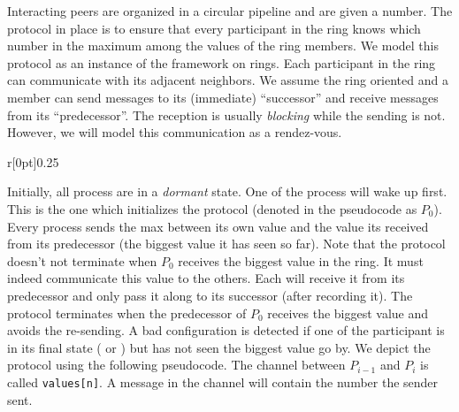 %
Interacting peers are organized in a circular pipeline and are given a
number. The protocol in place is to ensure that every participant in
the ring knows which number in the maximum among the values of the
ring members. We model this protocol as an instance of the framework
on rings. Each participant in the ring can communicate with its
adjacent neighbors. We assume the ring oriented and a member can send
messages to its (immediate) ``successor'' and receive messages from
its ``predecessor''. The reception is usually \emph{blocking} while
the sending is not. However, we will model this communication as a
rendez-vous.

\noindent%
\begin{wrapfigure}{r}[0pt]{0.25\linewidth}
  \hfill%
\end{wrapfigure}
%
Initially, all process are in a \emph{dormant} state. One of the
process will wake up first. This is the one which initializes the
protocol (denoted in the pseudocode as $P_0$). Every process sends the
max between its own value and the value its received from its
predecessor (the biggest value it has seen so far). Note that the
protocol doesn't not terminate when $P_0$ receives the biggest value
in the ring. It must indeed communicate this value to the others. Each
will receive it from its predecessor and only pass it along to its
successor (after recording it). The protocol terminates when the
predecessor of $P_0$ receives the biggest value and avoids the
re-sending. A bad configuration is detected if one of the participant
is in its final state ( or ) but has not seen the
biggest value go by. %
We depict the protocol using the following pseudocode. The channel
between $P_{i-1}$ and $P_i$ is called {\tt values[n]}. A message in
the channel will contain the number the sender sent.

\bigskip

